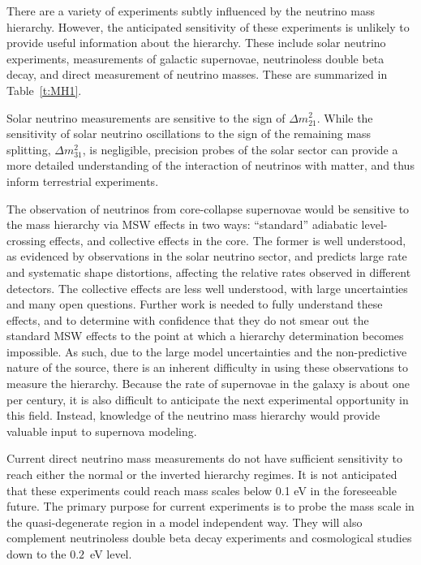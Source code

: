 There are a variety of experiments subtly influenced by the neutrino
mass hierarchy.  However, the anticipated sensitivity of these
experiments is unlikely to provide useful information about the
hierarchy.  These include solar neutrino experiments, measurements of
galactic supernovae, neutrinoless double beta decay, and direct
measurement of neutrino masses.   These are summarized in Table~\ref{t:MH1}.

Solar neutrino measurements are sensitive to the sign of $\Delta m^2_{21}$. 
While the sensitivity of solar neutrino oscillations
to the sign of the remaining mass splitting, $\Delta m^2_{31}$, is negligible, precision probes of the solar
sector can provide a more detailed understanding of the interaction of neutrinos with matter,
and thus inform terrestrial experiments.

The observation of neutrinos from core-collapse supernovae would be sensitive to the mass
hierarchy via MSW effects in two ways: ``standard'' adiabatic level-crossing effects, and
collective effects in the core. The former is well understood, as evidenced by observations
in the solar neutrino sector, and predicts large rate and systematic shape
distortions, affecting the relative rates observed in different detectors. The collective effects
are less well understood, with large uncertainties and many open questions. Further work
is needed to fully understand these effects, and to determine with confidence that they do
not smear out the standard MSW effects to the point at which a hierarchy determination
becomes impossible. As such, due to the large model uncertainties and the non-predictive
nature of the source, there is an inherent difficulty in using these observations to measure the
hierarchy. Because the rate of supernovae in the galaxy is about one per century, it is also
difficult to anticipate the next experimental opportunity in this field. Instead, knowledge of
the neutrino mass hierarchy would provide valuable input to supernova modeling.

 Current direct neutrino mass measurements do not have sufficient  sensitivity to reach either the
normal or the inverted hierarchy regimes. It is not anticipated that these experiments could
reach mass scales below 0.1 eV in the foreseeable future. The primary purpose for current
experiments is to probe the mass scale in the quasi-degenerate region in a model independent
way. They will also complement neutrinoless double beta decay experiments and cosmological studies down to the $0.2$~eV level.
 
